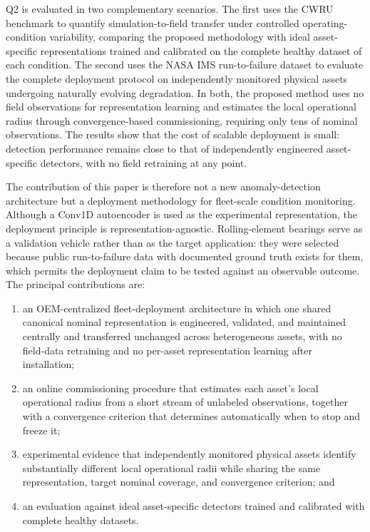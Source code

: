 \documentclass{trbunofficial}
\begin{document}
Q2 is evaluated in two complementary scenarios. The first uses the CWRU \citep{smith2015}
benchmark to quantify simulation-to-field transfer under controlled operating-condition
variability, comparing the proposed methodology with ideal asset-specific representations trained
and calibrated on the complete healthy dataset of each condition. The second uses the NASA IMS
run-to-failure dataset to evaluate the complete deployment protocol on independently monitored
physical assets undergoing naturally evolving degradation. In both, the proposed method uses no
field observations for representation learning and estimates the local operational radius through
convergence-based commissioning, requiring only tens of nominal observations. The results show
that the cost of scalable deployment is small: detection performance remains close to that of
independently engineered asset-specific detectors, with no field retraining at any point.

The contribution of this paper is therefore not a new anomaly-detection architecture but a
deployment methodology for fleet-scale condition monitoring. Although a Conv1D autoencoder is
used as the experimental representation, the deployment principle is representation-agnostic.
Rolling-element bearings serve as a validation vehicle rather than as the target application: they
were selected because public run-to-failure data with documented ground truth exists for them,
which permits the deployment claim to be tested against an observable outcome. The principal
contributions are:

\begin{enumerate}[leftmargin=1.5em]
\item an OEM-centralized fleet-deployment architecture in which one shared canonical nominal
representation is engineered, validated, and maintained centrally and transferred unchanged across
heterogeneous assets, with no field-data retraining and no per-asset representation learning after
installation;

\item an online commissioning procedure that estimates each asset's local operational radius from
a short stream of unlabeled observations, together with a convergence criterion that determines
automatically when to stop and freeze it;

\item experimental evidence that independently monitored physical assets identify substantially
different local operational radii while sharing the same representation, target nominal coverage,
and convergence criterion; and

\item an evaluation against ideal asset-specific detectors trained and calibrated with complete
healthy datasets.
\end{enumerate}
\end{document}
